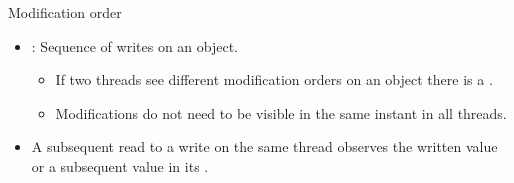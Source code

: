 \begin{frame}[t]{Modification order}
\begin{itemize}
  \item {}: Sequence of writes on an object.
    \begin{itemize}
      \item If two threads see different modification orders on an object there is a .
      \item Modifications do not need to be visible in the same instant in all threads.
    \end{itemize}

  \item A subsequent read to a write on the same thread observes the written value or
        a subsequent value in its .
\end{itemize}
\end{frame}

